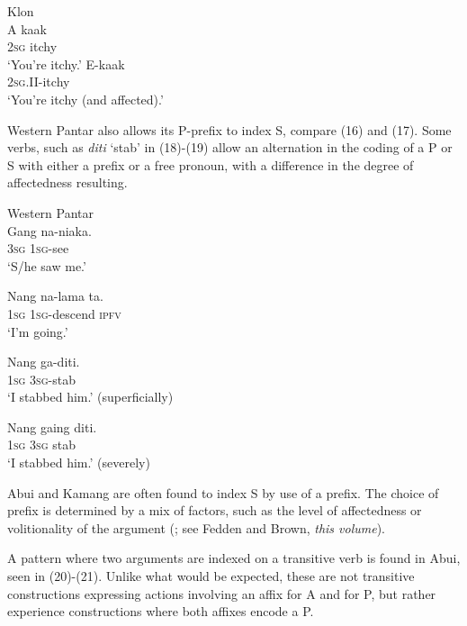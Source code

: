 \ea%
\label{ex:15}
 Klon \citep[8]{Baird2008}   \\
\ea
\gll A  kaak \\
 \textsc{2sg} itchy      \\
\glt `You're itchy.'
\ex
\gll E-kaak \\
  \textsc{2sg.II}{}-itchy   \\
\glt `You're itchy (and affected).'
\z\z



Western Pantar also allows its P-prefix to index S, compare (16) and (17).  Some verbs, such as \textit{diti} `stab' in (18)-(19) allow an alternation in the coding of a P or S with either a prefix or a free pronoun, with a difference in the degree of affectedness resulting.


\ea%
\label{ex:16}
Western Pantar \citep[105-106]{Holton2010a}   \\
\gll Gang  na-niaka. \\
 3\textsc{sg}  \textsc{1sg}{}-see      \\
\glt `S/he saw me.'
\z


\ea%
\label{ex:17}
\gll  Nang   na-lama   ta.  \\
 1\textsc{sg}   \textsc{1sg}{}-descend   \textsc{ipfv}  \\
\glt `I'm going.'
\z


\ea%
\label{ex:18}
\gll Nang    ga-diti. \\
1\textsc{sg}    3\textsc{sg}{}-stab     \\
\glt `I stabbed him.' (superficially)
\z




\ea%
\label{ex:19}
\gll Nang  gaing   diti. \\
 1\textsc{sg}   3\textsc{sg}  stab  \\
\glt `I stabbed him.' (severely)
\z



Abui and Kamang are often found to index S by use of a prefix. The choice of prefix is determined by a mix of factors, such as the level of affectedness or volitionality of the argument (\citet{FeddenEtAl2013,FeddenEtAl2014}; see Fedden and Brown, \textit{this volume}).

A pattern where two arguments are indexed on a transitive verb is found in Abui, seen in (20)-(21). Unlike what would be expected, these are not transitive constructions expressing actions involving an affix for A and for P, but rather experience constructions where both affixes encode a P.



